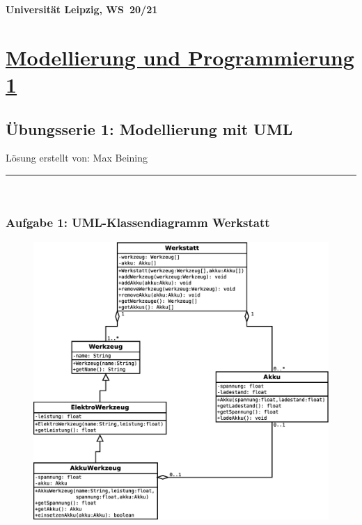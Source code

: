 \documentclass[11pt, a4paper, DIV=12]{scrartcl}
\begin{document}

\noindent
\textbf{Universität Leipzig, WS~20/21} \vspace*{-0.25cm}
\section*{\underline{Modellierung und Programmierung 1}}
\subsection*{Übungsserie 1: Modellierung mit UML}
\noindent
Lösung erstellt von: Max Beining \\
\rule{\linewidth}{1pt} \\


\subsubsection*{Aufgabe 1: UML-Klassendiagramm \glqq Werkstatt\grqq}
\begin{figure}[h]
	\centering
	\includegraphics[width=\linewidth]{uebung01_werkstatt.eps}
\end{figure}

\clearpage
\end{document}
